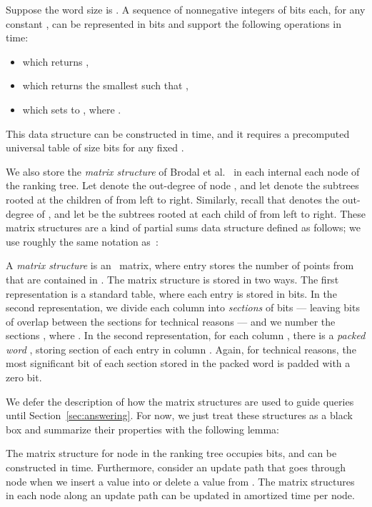 \documentclass{llncs}
\begin{document}
\begin{lemma}\label{lem:RRR}
Suppose the word size is .  A sequence  of
 nonnegative integers of  bits each, for any
constant , can be represented in  bits
and support the following operations in  time:
\begin{itemize}
\item  which returns ,
\item  which returns the smallest  such that
  ,
\item  which sets  to
  , where .
\end{itemize}
This data structure can be constructed in  time, and it
requires a precomputed universal table of size  bits for
any fixed .
\end{lemma}

We also store the \emph{matrix structure} of Brodal et
al.~\cite{BGJS10} in each internal each node  of the ranking tree.
Let  denote the out-degree of node
, and let  denote the subtrees
rooted at the children of  from left to right.  Similarly, recall
that  denotes the out-degree of , and let  be the subtrees rooted
at each child of  from left to right.  These matrix structures are
a kind of partial sums data structure defined as follows; we use
roughly the same notation as~\cite{BGJS10}:

\begin{definition}
  A \emph{matrix structure}  is an ~matrix, where
  entry  stores the number of points from  that are contained in .  The
  matrix structure  is stored in two ways.  The first
  representation is a standard table, where each entry is stored in
   bits.  In the second representation, we divide each
  column into \emph{sections} of  bits
  --- leaving  bits of overlap between the sections
  for technical reasons --- and we number the sections , where .  In the second
  representation, for each column , there is a \emph{packed word}
  , storing section  of each entry in column .
  Again, for technical reasons, the most significant bit of each
  section stored in the packed word  is padded with a zero
  bit.
\end{definition}

We defer the description of how the matrix structures are used to
guide queries until Section~\ref{sec:answering}.  For now, we just
treat these structures as a black box and summarize their properties
with the following lemma:

\begin{lemma}\label{lem:matrix-struct}
  The matrix structure  for node  in the ranking tree 
  occupies  bits, and can be
  constructed in  time.
  Furthermore, consider an update path that goes through node  when
  we insert a value into or delete a value from .  The matrix
  structures in each node along an update path can be updated in
   amortized time per node.
\end{lemma}
\end{document}
